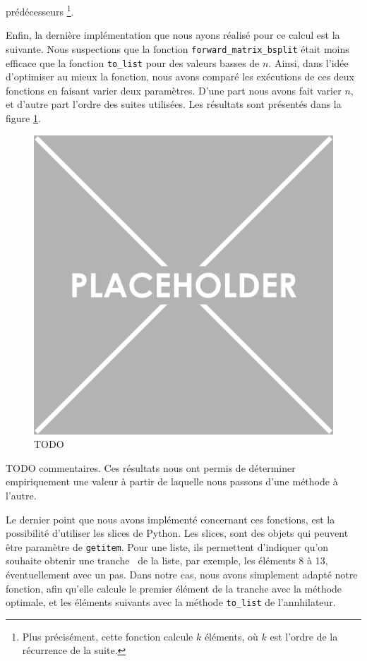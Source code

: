\documentclass[12pt]{article}
\newlength{\charwidth}
\newcommand{\uline}{\underline{\hspace{2\charwidth}}}
\begin{document}
        prédécesseurs
        \footnote{Plus précisément, cette fonction calcule $k$ éléments, où  $k$ est l'ordre de la
        récurrence de la suite.}.
        \par Enfin, la dernière implémentation que nous ayons réalisé pour ce calcul est la suivante.
        Nous suspections que la fonction \texttt{forward\_matrix\_bsplit} était moins efficace que la
        fonction \texttt{to\_list} pour des valeurs basses de $n$. Ainsi, dans l'idée d'optimiser au
        mieux la fonction, nous avons comparé les exécutions de ces deux fonctions en faisant varier
        deux paramètres. D'une part nous avons fait varier $n$, et d'autre part l'ordre des suites
        utilisées. Les résultats sont présentés dans la figure \ref{fig:getitem}.
        \begin{figure} \begin{center}
            \includegraphics[scale=0.4]{figures/placeholder.png}
            \caption{\label{fig:getitem}\color{red}TODO}
        \end{center} \end{figure}
        {\color{red} TODO commentaires}. Ces résultats nous ont permis de déterminer empiriquement
        une valeur à partir de laquelle nous passons d'une méthode à l'autre.\\
        \par Le dernier point que nous avons implémenté concernant ces fonctions,
        est la possibilité d'utiliser les slices de Python. Les slices, sont des objets
        qui peuvent être paramètre de \texttt{\uline getitem\uline}. Pour une liste, ils permettent
        d'indiquer qu'on souhaite obtenir une \og tranche \fg\ de la liste, par exemple, les éléments
        8 à 13, éventuellement avec un pas. Dans notre cas, nous avons simplement adapté notre
        fonction, afin qu'elle calcule le premier élément de la tranche avec la méthode optimale,
        et les éléments suivants avec la méthode \texttt{to\_list} de l'annhilateur.
\end{document}
